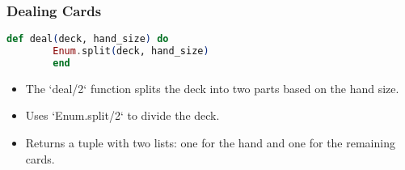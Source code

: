 \documentclass[aspectratio=169, table]{beamer}
\begin{document}
\begin{frame}[fragile]
	\frametitle{Dealing Cards}
	\begin{lstlisting}[language=Elixir]
		def deal(deck, hand_size) do
		Enum.split(deck, hand_size)
		end
	\end{lstlisting}
	\begin{itemize}
		\item The `deal/2` function splits the deck into two parts based on the hand size.
		\item Uses `Enum.split/2` to divide the deck.
		\item Returns a tuple with two lists: one for the hand and one for the remaining cards.
	\end{itemize}
\end{frame}
\end{document}
